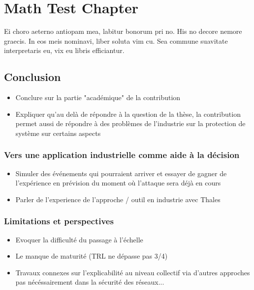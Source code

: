 \chapter{Math Test Chapter}\label{ch:mathtest} %
Ei choro aeterno antiopam mea, labitur bonorum pri no. His no decore
nemore graecis. In eos meis nominavi, liber soluta vim cu. Sea commune
suavitate interpretaris eu, vix eu libris efficiantur.



\section{Conclusion}
\begin{itemize}

    \item Conclure sur la partie "académique" de la contribution
    \item Expliquer qu'au delà de répondre à la question de la thèse, la contribution permet aussi de répondre à des problèmes de l'industrie sur la protection de système sur certains aspects
\end{itemize}

\subsection{Vers une application industrielle comme aide à la décision}
\begin{itemize}

    \item Simuler des événements qui pourraient arriver et essayer de gagner de l'expérience en prévision du moment où l’attaque sera déjà en cours
    \item Parler de l'experience de l'approche / outil en industrie avec Thales
\end{itemize}

\subsection{Limitations et perspectives}

\begin{itemize}

    \item Evoquer la difficulté du passage à l'échelle
    \item Le manque de maturité (TRL ne dépasse pas 3/4)
    \item Travaux connexes sur l'explicabilité au niveau collectif via d'autres approches pas nécéssairement dans la sécurité des réseaux...
\end{itemize}

